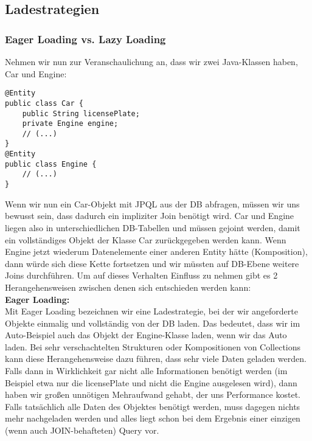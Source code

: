 \subsection{Ladestrategien}

\subsubsection{Eager Loading vs. Lazy Loading}

Nehmen wir nun zur Veranschaulichung an, dass wir zwei Java-Klassen haben, Car und Engine:

\begin{lstlisting}
@Entity
public class Car {
    public String licensePlate;
    private Engine engine;
    // (...)
}
@Entity
public class Engine {
    // (...)
}
\end{lstlisting}

Wenn wir nun ein Car-Objekt mit JPQL aus der DB abfragen, müssen wir uns bewusst sein, dass dadurch ein impliziter Join benötigt wird. Car und Engine liegen also in unterschiedlichen DB-Tabellen und müssen gejoint werden, damit ein vollständiges Objekt der Klasse Car zurückgegeben werden kann. Wenn Engine jetzt wiederum Datenelemente einer anderen Entity hätte (Komposition), dann würde sich diese Kette fortsetzen und wir müssten auf DB-Ebene weitere Joins durchführen. Um auf dieses Verhalten Einfluss zu nehmen gibt es 2 Herangehensweisen zwischen denen sich entschieden werden kann:\\

\textbf{Eager Loading:}\\
Mit Eager Loading bezeichnen wir eine Ladestrategie, bei der wir angeforderte Objekte einmalig und vollständig von der DB laden. Das bedeutet, dass wir im Auto-Beispiel auch das Objekt der Engine-Klasse laden, wenn wir das Auto laden. Bei sehr verschachtelten Strukturen oder Kompositionen von Collections kann diese Herangehensweise dazu führen, dass sehr viele Daten geladen werden. Falls dann in Wirklichkeit gar nicht alle Informationen benötigt werden (im Beispiel etwa nur die licensePlate und nicht die Engine ausgelesen wird), dann haben wir großen unnötigen Mehraufwand gehabt, der uns Performance kostet. Falls tatsächlich alle Daten des Objektes benötigt werden, muss dagegen nichts mehr nachgeladen werden und alles liegt schon bei dem Ergebnis einer einzigen (wenn auch JOIN-behafteten) Query vor.

